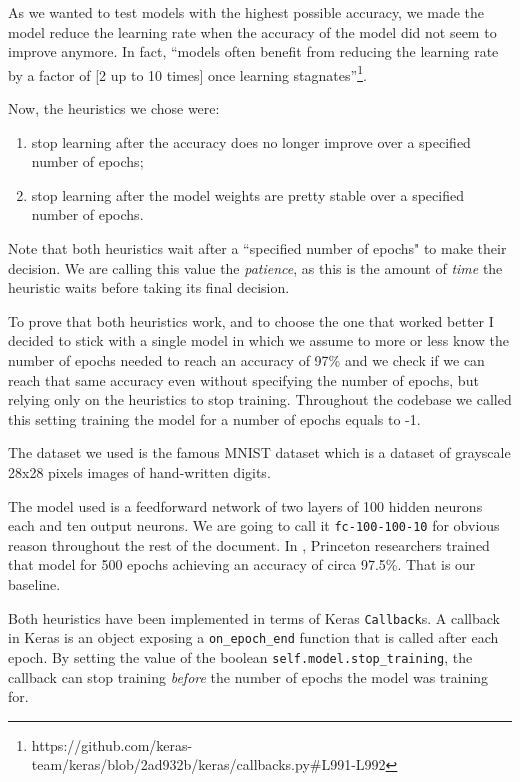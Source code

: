 As we wanted to test models with the highest possible accuracy, we made
the model reduce the learning rate when the accuracy of the model
did not seem to improve anymore. In fact, ``models often benefit from
reducing the learning rate by a factor of [2 up to 10 times] once
learning
stagnates''\footnote{https://github.com/keras-team/keras/blob/2ad932b/keras/callbacks.py\#L991-L992}.

Now, the heuristics we chose were:
\begin{enumerate}
  \item stop learning after the accuracy does no longer improve over a
    specified number of epochs;
  \item stop learning after the model weights are pretty stable over a
    specified number of epochs.
\end{enumerate}

Note that both heuristics wait after a ``specified number of
epochs" to make their decision. We are calling this value the
\emph{patience}, as this is the amount of \emph{time} the heuristic waits
before taking its final decision.

To prove that both heuristics work, and to choose the one that
worked better I decided to stick with a single model in which we assume
to more or less know the number of epochs needed to reach an accuracy
of 97\% and we check if we can reach that same accuracy even without
specifying the number of epochs, but relying only on the heuristics to
stop training. Throughout the codebase we called this setting training
the model for a number of epochs equals to -1.

The dataset we used is the famous MNIST dataset which is a dataset of
grayscale 28x28 pixels images of hand-written digits.

The model used is a feedforward network of two layers of 100 hidden
neurons each and ten output neurons. We are going to call it
\texttt{fc-100-100-10} for obvious reason throughout the rest of the
document. In \cite{bhagoji2018enhancing}, Princeton researchers trained
that model for 500 epochs achieving an accuracy of circa 97.5\%. That is our
baseline.

Both heuristics have been implemented in terms of Keras
\texttt{Callback}s. A callback in Keras is an object exposing a
\texttt{on\_epoch\_end} function that is called after each epoch. By
setting the value of the boolean \texttt{self.model.stop\_training}, the
callback can stop training \emph{before} the number of epochs the model
was training for.

